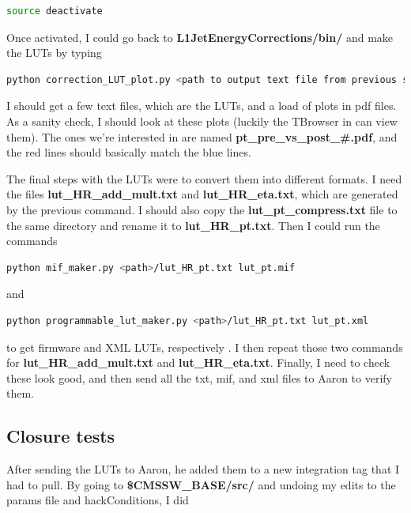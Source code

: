 \begin{lstlisting}[belowskip=-0.7cm, language=sh, numbers=none]
source deactivate
\end{lstlisting}

Once activated, I could go back to \textbf{L1JetEnergyCorrections/bin/} and make the LUTs by typing

\begin{lstlisting}[belowskip=-0.7cm, language=sh, numbers=none]
python correction_LUT_plot.py <path to output text file from previous step> <output path>/lut_HR.txt --stage2 --plots --text --ptCompressionFile lut_pt_compress.txt
\end{lstlisting}

I should get a few text files, which are the LUTs, and a load of plots in pdf files. As a sanity check, I should look at these plots (luckily the TBrowser in \ROOT can view them). The ones we're interested in are named \textbf{pt\_pre\_vs\_post\_\#.pdf}, and the red lines should basically match the blue lines. 

The final steps with the LUTs were to convert them into different formats. I need the files \textbf{lut\_HR\_add\_mult.txt} and \textbf{lut\_HR\_eta.txt}, which are generated by the previous command. I should also copy the \textbf{lut\_pt\_compress.txt} file to the same directory and rename it to \textbf{lut\_HR\_pt.txt}. Then I could run the commands

\begin{lstlisting}[belowskip=-0.7cm, language=sh, numbers=none]
python mif_maker.py <path>/lut_HR_pt.txt lut_pt.mif
\end{lstlisting}

and

\begin{lstlisting}[belowskip=-0.7cm, language=sh, numbers=none]
python programmable_lut_maker.py <path>/lut_HR_pt.txt lut_pt.xml
\end{lstlisting}

to get firmware and XML LUTs, respectively . I then repeat those two commands for \textbf{lut\_HR\_add\_mult.txt} and \textbf{lut\_HR\_eta.txt}. Finally, I need to check these look good, and then send all the txt, mif, and xml files to Aaron to verify them.


\subsection{Closure tests}

After sending the LUTs to Aaron, he added them to a new integration tag that I had to pull. By going to \textbf{\$CMSSW\_BASE/src/} and undoing my edits to the params file and hackConditions, I did

